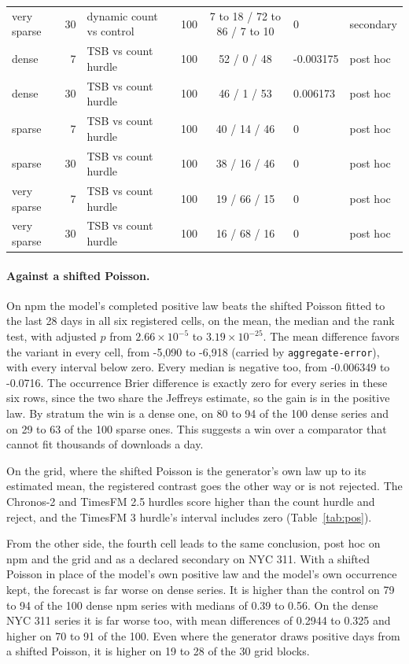 \begin{table}[p]
\begin{tabular}{lrllcll}
very sparse & 30 & dynamic count vs control & 100 & 7 to 18 / 72 to 86 / 7 to 10 & 0 & secondary \\
dense & 7 & TSB vs count hurdle & 100 & 52 / 0 / 48 & -0.003175 & post hoc \\
dense & 30 & TSB vs count hurdle & 100 & 46 / 1 / 53 & 0.006173 & post hoc \\
sparse & 7 & TSB vs count hurdle & 100 & 40 / 14 / 46 & 0 & post hoc \\
sparse & 30 & TSB vs count hurdle & 100 & 38 / 16 / 46 & 0 & post hoc \\
very sparse & 7 & TSB vs count hurdle & 100 & 19 / 66 / 15 & 0 & post hoc \\
very sparse & 30 & TSB vs count hurdle & 100 & 16 / 68 / 16 & 0 & post hoc \\
\bottomrule
\end{tabular}
\end{table}

\paragraph{Against a shifted Poisson.} On npm the model's completed positive law beats the shifted Poisson
fitted to the last 28 days in all six registered cells, on the mean, the median and the rank test, with
adjusted $p$ from $2.66 \times 10^{-5}$ to $3.19 \times 10^{-25}$. The mean difference favors the variant in
every cell, from -5,090 to -6,918 (carried by \texttt{aggregate-error}), with every interval below zero. Every
median is negative too, from -0.006349 to -0.0716. The occurrence Brier difference is exactly zero for every
series in these six rows, since the two share the Jeffreys estimate, so the gain is in the positive law. By
stratum the win is a dense one, on 80 to 94 of the 100 dense series and on 29 to 63 of the 100 sparse ones.
This suggests a win over a comparator that cannot fit thousands of downloads a day.

On the grid, where the shifted Poisson is the generator's own law up to its estimated mean, the registered
contrast goes the other way or is not rejected. The Chronos-2 and TimesFM 2.5 hurdles score higher than the
count hurdle and reject, and the TimesFM 3 hurdle's interval includes zero (Table~\ref{tab:pos}).

From the other side, the fourth cell leads to the same conclusion, post hoc on npm and the grid and as a
declared secondary on NYC 311. With a shifted Poisson in place of the model's own positive law and the model's
own occurrence kept, the forecast is far worse on dense series. It is higher than the control on 79 to 94 of
the 100 dense npm series with medians of 0.39 to 0.56. On the dense NYC 311 series it is far worse too, with
mean differences of 0.2944 to 0.325 and higher on 70 to 91 of the 100. Even where the generator draws positive
days from a shifted Poisson, it is higher on 19 to 28 of the 30 grid blocks.

